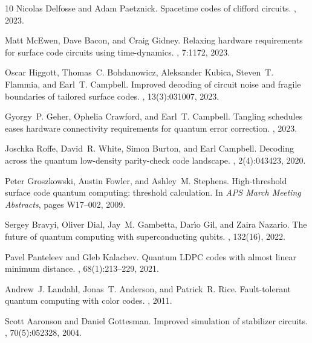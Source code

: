 \documentclass{article}
\begin{document}
\begin{thebibliography}{10}
	Nicolas Delfosse and Adam Paetznick.
	\newblock Spacetime codes of clifford circuits.
	, 2023.
	
	Matt McEwen, Dave Bacon, and Craig Gidney.
	\newblock Relaxing hardware requirements for surface code circuits using
	time-dynamics.
	, 7:1172, 2023.
	
	Oscar Higgott, Thomas~C. Bohdanowicz, Aleksander Kubica, Steven~T. Flammia, and
	Earl~T. Campbell.
	\newblock Improved decoding of circuit noise and fragile boundaries of tailored
	surface codes.
	, 13(3):031007, 2023.
	
	Gyorgy~P. Geher, Ophelia Crawford, and Earl~T. Campbell.
	\newblock Tangling schedules eases hardware connectivity requirements for
	quantum error correction.
	, 2023.
	
	Joschka Roffe, David~R. White, Simon Burton, and Earl Campbell.
	\newblock Decoding across the quantum low-density parity-check code landscape.
	, 2(4):043423, 2020.
	
	Peter Groszkowski, Austin Fowler, and Ashley~M. Stephens.
	\newblock High-threshold surface code quantum computing: threshold calculation.
	\newblock In {\em APS March Meeting Abstracts}, pages W17--002, 2009.
	
	Sergey Bravyi, Oliver Dial, Jay~M. Gambetta, Dar{\'\i}o Gil, and Zaira Nazario.
	\newblock The future of quantum computing with superconducting qubits.
	, 132(16), 2022.
	
	Pavel Panteleev and Gleb Kalachev.
	\newblock Quantum {LDPC} codes with almost linear minimum distance.
	, 68(1):213--229, 2021.
	
	Andrew~J. Landahl, Jonas~T. Anderson, and Patrick~R. Rice.
	\newblock Fault-tolerant quantum computing with color codes.
	, 2011.
	
	Scott Aaronson and Daniel Gottesman.
	\newblock Improved simulation of stabilizer circuits.
	, 70(5):052328, 2004.
	

\end{thebibliography}
\end{document}

